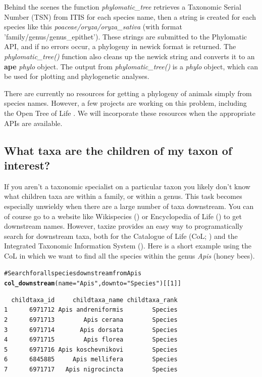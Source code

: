 \documentclass[letterpaper,superscriptaddress,showkeys,longbibliography,10pt]{revtex4-1}\usepackage{graphicx, color}
\makeatletter
\newcommand{\hlfunctioncall}[1]{\textcolor[rgb]{0.501960784313725,0,0.329411764705882}{\textbf{#1}}}%
\newcommand{\hlstring}[1]{\textcolor[rgb]{0.6,0.6,1}{#1}}%
\newcommand{\hlcomment}[1]{\textcolor[rgb]{0.180392156862745,0.6,0.341176470588235}{#1}}%
\newenvironment{kframe}{%
 \def\at@end@of@kframe{}%
 \ifinner\ifhmode%
  \def\at@end@of@kframe{\end{minipage}}%
  \begin{minipage}{\columnwidth}%
 \fi\fi%
 \def\FrameCommand##1{\hskip\@totalleftmargin \hskip-\fboxsep
 \colorbox{shadecolor}{##1}\hskip-\fboxsep
     \hskip-\linewidth \hskip-\@totalleftmargin \hskip\columnwidth}%
 \MakeFramed {\advance\hsize-\width
   \@totalleftmargin\z@ \linewidth\hsize
   \@setminipage}}%
 {\par\unskip\endMakeFramed%
 \at@end@of@kframe}
\newenvironment{knitrout}{}{} %
\makeatother
\begin{document}
Behind the scenes the function \emph{phylomatic\_tree} retrieves a Taxonomic Serial Number (TSN) from ITIS for each species name, then a string is created for each species like this \emph{poaceae/oryza/oryza\_sativa} (with format 'family/genus/genus\_epithet'). These strings are submitted to the Phylomatic API, and if no errors occur, a phylogeny in newick format is returned. The \emph{phylomatic\_tree()} function also cleans up the newick string and converts it to an \textbf{ape} \emph{phylo} object. The output from \emph{phylomatic\_tree()} is a \emph{phylo} object, which can be used for plotting and phylogenetic analyses. 

There are currently no resources for getting a phylogeny of animals simply from species names. However, a few projects are working on this problem, including the Open Tree of Life \cite{opentree}. We will incorporate these resources when the appropriate APIs are available.

\subsection{What taxa are the children of my taxon of interest?}

If you aren't a taxonomic specialist on a particular taxon you likely don't know what children taxa are within a family, or within a genus. This task becomes especially unwieldy when there are a large number of taxa downstream. You can of course go to a website like Wikispecies (\cite{wikispecies}) or Encyclopedia of Life (\cite{eol}) to get downstream names. However, taxize provides an easy way to programatically search for downstream taxa, both for the Catalogue of Life (CoL; \cite{col}) and the Integrated Taxonomic Information System (\cite{itis}). Here is a short example using the CoL in which we want to find all the species within the genus \emph{Apis} (honey bees).

\begin{knitrout}
\color{fgcolor}\begin{kframe}
\begin{alltt}
\hlcomment{# Search for all species downstream from Apis}
\hlfunctioncall{col_downstream}(name = \hlstring{"Apis"}, downto = \hlstring{"Species"})[[1]]
\end{alltt}
\begin{verbatim}
  childtaxa_id     childtaxa_name childtaxa_rank
1      6971712 Apis andreniformis        Species
2      6971713        Apis cerana        Species
3      6971714       Apis dorsata        Species
4      6971715        Apis florea        Species
5      6971716 Apis koschevnikovi        Species
6      6845885     Apis mellifera        Species
7      6971717   Apis nigrocincta        Species
\end{verbatim}
\end{kframe}
\end{knitrout}
\end{document}
